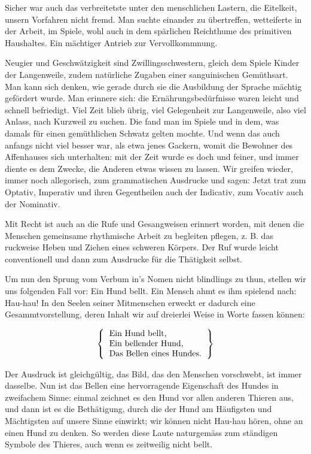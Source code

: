 Sicher war auch das verbreitetste unter den menschlichen Lastern, die Eitelkeit, unsern Vorfahren nicht fremd. Man suchte einander zu übertreffen, wetteiferte in der Arbeit, im Spiele, wohl auch in dem spärlichen Reichthume des primitiven Haushaltes. Ein mächtiger Antrieb zur Vervollkommnung.

Neugier und Geschwätzigkeit sind Zwillingsschwestern, gleich dem Spiele Kinder der Langenweile, zudem natürliche Zugaben einer sanguinischen Gemüthsart. Man kann sich denken, wie gerade durch sie die Ausbildung der Sprache mächtig gefördert wurde. Man erinnere sich: die Ernährungsbedürfnisse waren leicht und schnell befriedigt. Viel Zeit blieb übrig, viel Gelegenheit zur Langenweile, also viel Anlass, nach Kurzweil zu suchen. Die fand man im Spiele und in dem, was damals für einen gemüthlichen Schwatz gelten mochte. Und wenn das auch anfangs nicht viel besser war, als etwa jenes Gackern, womit die Bewohner des Affenhauses sich unterhalten: mit der Zeit wurde es doch \label{fp.300}  und feiner, und immer diente es dem Zwecke, die Anderen etwas wissen zu lassen. Wir greifen wieder, immer noch allegorisch, zum grammatischen Ausdrucke und sagen: Jetzt trat zum Optativ, Imperativ und ihren Gegentheilen auch der Indicativ, zum Vocativ auch der Nominativ.

Mit Recht ist auch an die Rufe und Gesangweisen erinnert worden, mit denen die Menschen gemeinsame rhythmische Arbeit zu begleiten pflegen, z. B. das ruckweise Heben und Ziehen eines schweren Körpers. Der Ruf wurde leicht conventionell und dann zum Ausdrucke für die Thätigkeit selbst.

Um nun den Sprung vom Verbum in’s Nomen nicht blindlings zu thun, stellen wir uns folgenden Fall vor: Ein Hund bellt. Ein Mensch ahmt es ihm spielend nach: Hau-hau! In den Seelen seiner Mitmenschen erweckt er \label{sp.310} dadurch eine Gesammtvorstellung, deren Inhalt wir auf dreierlei Weise in Worte fassen können:

\[
\left \{
\begin{tabular}{l}
Ein Hund bellt, \\
Ein bellender Hund, \\
Das Bellen eines Hundes.
\end{tabular}
\right \}
\]

Der Ausdruck ist gleichgültig, das Bild, das den Menschen vorschwebt, ist immer dasselbe. Nun ist das Bellen eine hervorragende Eigenschaft des Hundes in zweifachem Sinne: einmal zeichnet es den Hund vor allen anderen Thieren aus, und dann ist es die Bethätigung, durch die der Hund am Häufigsten und Mächtigsten auf unsere Sinne einwirkt; wir können nicht Hau-hau hören, ohne an einen Hund zu denken. So werden diese Laute naturgemäss zum ständigen Symbole des Thieres, auch wenn es zeitweilig nicht bellt.

